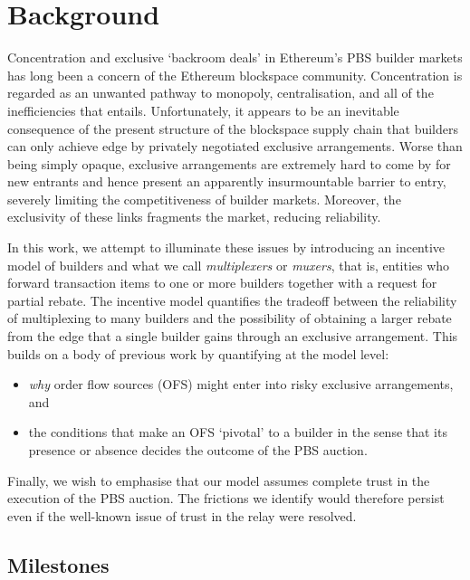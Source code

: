 \maketitle

\section*{Background}

Concentration and exclusive `backroom deals' in Ethereum's PBS builder markets has long been a concern of the Ethereum blockspace community.
%
Concentration is regarded as an unwanted pathway to monopoly, centralisation, and all of the inefficiencies that entails. 
%
Unfortunately, it appears to be an inevitable consequence of the present structure of the blockspace supply chain that builders can only achieve edge by privately negotiated exclusive arrangements.
%
Worse than being simply opaque, exclusive arrangements are extremely hard to come by for new entrants and hence present an apparently insurmountable barrier to entry, severely limiting the competitiveness of builder markets.
%
Moreover, the exclusivity of these links fragments the market, reducing reliability.

In this work, we attempt to illuminate these issues by introducing an incentive model of builders and what we call \emph{multiplexers} or \emph{muxers}, that is, entities who forward transaction items to one or more builders together with a request for partial rebate.
%
The incentive model quantifies the tradeoff between the reliability of multiplexing to many builders and the possibility of obtaining a larger rebate from the edge that a single builder gains through an exclusive arrangement.
%
This builds on a body of previous work by quantifying at the model level:
%
\begin{itemize}
    \item \emph{why} order flow sources (OFS) might enter into risky exclusive arrangements, and 
    \item the conditions that make an OFS `pivotal' to a builder in the sense that its presence or absence decides the outcome of the PBS auction.
\end{itemize}
%
Finally, we wish to emphasise that our model assumes complete trust in the execution of the PBS auction.
%
The frictions we identify would therefore persist even if the well-known issue of trust in the relay were resolved.

\subsection*{Milestones}

